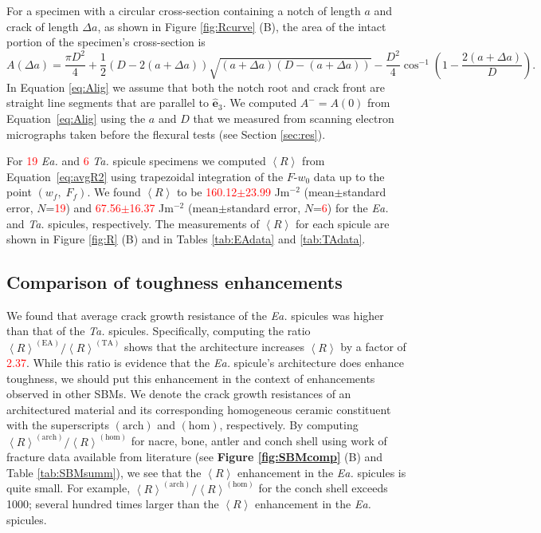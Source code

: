 \documentclass[12pt,onecolumn]{article}
\makeatletter
\newcommand{\ez}{{\bm{\hat{e}}}_3}
\newcommand{\TA}{\textit{Ta.\@}\xspace}
\newcommand{\EA}{\textit{Ea.\@}\xspace}
\makeatother
\begin{document}
\begin{bibunit}
For a specimen with a circular cross-section containing a notch of length $a$ and crack of length $\Delta a$, as shown in Figure \ref{fig:Rcurve} (B), the area of the intact portion of the specimen's cross-section is
%
\begin{equation}
    \label{eq:Alig}
    A(\Delta a)=\frac{\pi D^2}{4}+\frac{1}{2}\left(D-2(a+\Delta a)\right)\sqrt{(a+\Delta a)(D-(a+\Delta a))}-\frac{D^2}{4}\cos^{-1}\left(1-\frac{2(a+\Delta a)}{D}\right).
\end{equation}
%
In Equation \eqref{eq:Alig} we assume that both the notch root and crack front are straight line segments that are parallel to $\ez$. We computed $A^-=A(0)$ from Equation~\eqref{eq:Alig} using the $a$ and $D$ that we measured from scanning electron micrographs taken before the flexural tests (see Section \ref{sec:res}).

For \textcolor{red}{19} \EA and \textcolor{red}{6} \TA spicule specimens we computed $\left< R\right>$ from Equation~\eqref{eq:avgR2} using trapezoidal integration of the $F$-$w_0$ data up to the point $(w_f, \; F_f)$. We found  $\left< R \right>$ to be \textcolor{red}{160.12$\pm$23.99} Jm$^{-2}$ (mean$\pm$standard error, $N$=\textcolor{red}{19}) and \textcolor{red}{67.56$\pm$16.37} Jm$^{-2}$ (mean$\pm$standard error, $N$=\textcolor{red}{6}) for the \EA and \TA spicules, respectively. The measurements of $\left< R \right>$ for each spicule are shown in Figure \ref{fig:R} (B) and in Tables \ref{tab:EAdata} and \ref{tab:TAdata}.

\subsection{Comparison of toughness enhancements}
\label{sec:Rcomp}
We found that average crack growth resistance of the \EA spicules was higher than that of the \TA spicules. Specifically, computing the ratio $\left< R\right>^{(\mathrm{EA})}/\left< R\right>^{(\mathrm{TA})}$ shows that the architecture increases $\left< R\right>$ by a factor of \textcolor{red}{2.37}. While this ratio is evidence that the \EA spicule's architecture does enhance toughness, we should put this enhancement in the context of enhancements observed in other SBMs. We denote the crack growth resistances of an architectured material and its corresponding homogeneous ceramic constituent with the superscripts $(\mathrm{arch})$ and $(\mathrm{hom})$, respectively. By computing $\left< R\right>^{(\mathrm{arch})}/\left< R\right>^{(\mathrm{hom})}$ for nacre, bone, antler and conch shell using work of fracture data available from literature (see {\bf Figure \ref{fig:SBMcomp}} (B) and Table \ref{tab:SBMsumm}), we see that the $\left< R \right>$ enhancement in the \EA spicules is quite small. For example, $\left< R\right>^{(\mathrm{arch})}/\left< R\right>^{(\mathrm{hom})}$ for the conch shell exceeds 1000; several hundred times larger than the $\left< R \right>$ enhancement in the \EA spicules.


\end{bibunit}
\end{document}
